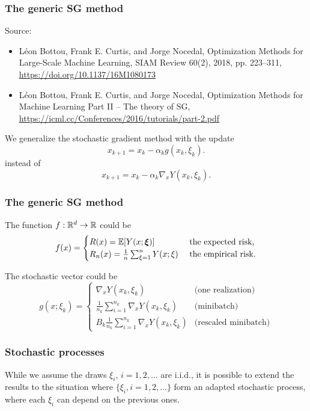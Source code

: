 \documentclass[usepdftitle=false, aspectratio=169]{beamer}
\begin{document}
\begin{frame}
\frametitle{The generic SG method}

Source:
\begin{itemize}
\item 
Léon Bottou, Frank E. Curtis, and Jorge Nocedal, Optimization Methods for Large-Scale Machine Learning, SIAM Review 60(2), 2018, pp. 223--311, \url{https://doi.org/10.1137/16M1080173}
\item
Léon Bottou, Frank E. Curtis, and Jorge Nocedal, Optimization Methods for Machine Learning
Part II – The theory of SG, \url{https://icml.cc/Conferences/2016/tutorials/part-2.pdf}
\end{itemize}

\mbox{}

We generalize the stochastic gradient method with the update
$$
x_{k+1} = x_k - \alpha_k g(x_k, \xi_k).
$$
instead of
$$
x_{k+1} = x_k - \alpha_k \nabla_x Y(x_k, \xi_k).
$$

\end{frame}

\begin{frame}
\frametitle{The generic SG method}

The function $f: {\mathbb{R}}^d \rightarrow {\mathbb{R}}$ could be
$$
f(x) =
\begin{cases}
R(x) = {\mathbb{E}} [ Y(x; {\boldsymbol{\xi}}) ] & \text{ the expected risk,} \\
R_n(x) = \frac{1}{n} \sum_{\xi = 1}^n Y(x; \xi) & \text{ the empirical risk.}
\end{cases}
$$

\mbox{}

The stochastic vector could be
$$
g(x; \xi_k) =
\begin{cases}
\nabla_x Y(x_k, \xi_k) & \text{(one realization)} \\
\frac{1}{n_k} \sum_{i = 1}^{n_k} \nabla_x Y(x_k, \xi_k) & \text{(minibatch)} \\
B_k \frac{1}{n_k} \sum_{i = 1}^{n_k} \nabla_x Y(x_k, \xi_k)
& \text{(rescaled minibatch)}
\end{cases}
$$

\end{frame}

\begin{frame}
\frametitle{Stochastic processes}

While we assume the draws $\xi_i$, $i = 1,2,\ldots$ are i.i.d., it is possible to extend the results to the situation where $\lbrace \xi_i, i = 1,2,\ldots \rbrace$ form an adapted stochastic process, where each $\xi_i$ can depend on the previous ones.

\end{frame}
\end{document}
